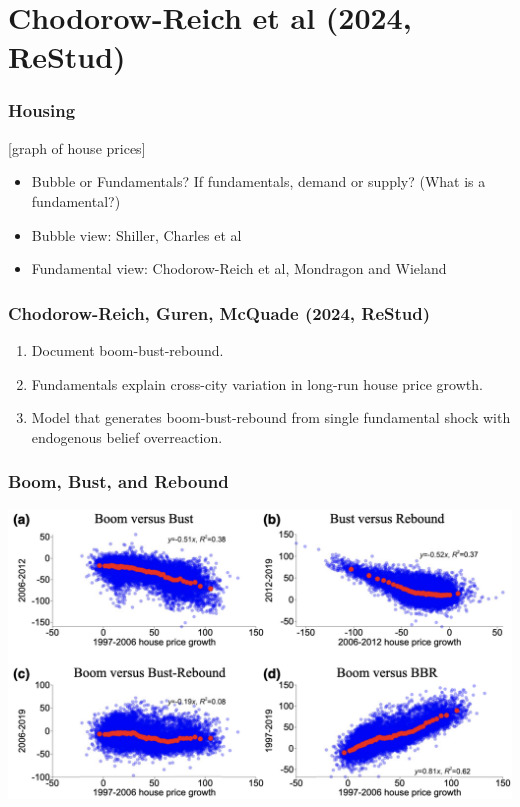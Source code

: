 \documentclass[english,xcolor=svgnames]{beamer}
\begin{document}
\section{Chodorow-Reich et al (2024, ReStud)}

\begin{frame}
	\frametitle[alignment=center]{Housing}
	[graph of house prices]
	\begin{itemize}
		\item Bubble or Fundamentals? If fundamentals, demand or supply? (What is a fundamental?)
		\item Bubble view: Shiller, Charles et al
		\item Fundamental view: Chodorow-Reich et al, Mondragon and Wieland
	\end{itemize}
\end{frame}

\begin{frame}
	\frametitle[alignment=center]{Chodorow-Reich, Guren, McQuade (2024, ReStud)}
	\begin{enumerate}
		\item Document boom-bust-rebound.
		\item Fundamentals explain cross-city variation in long-run house price growth.
		\item Model that generates boom-bust-rebound from single fundamental shock with endogenous belief overreaction.
	\end{enumerate}
\end{frame}

\begin{frame}
	\frametitle[alignment=center]{Boom, Bust, and Rebound}
	\centering
	\includegraphics[scale=0.4]{figures/CGMFIG2.png}
\end{frame}
\end{document}
